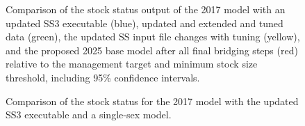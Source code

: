 \documentclass[
]{scrartcl}
\begin{document}
\begin{figure}


\caption{\label{fig-bridge23-comp4}Comparison of the stock status output
of the 2017 model with an updated SS3 executable (blue), updated and
extended and tuned data (green), the updated SS input file changes with
tuning (yellow), and the proposed 2025 base model after all final
bridging steps (red) relative to the management target and minimum stock
size threshold, including 95\% confidence intervals.}

\end{figure}%

\begin{figure}


\caption{\label{fig-ss3exe_2}Comparison of the stock status for the 2017
model with the updated SS3 executable and a single-sex model.}

\end{figure}%
\end{document}
